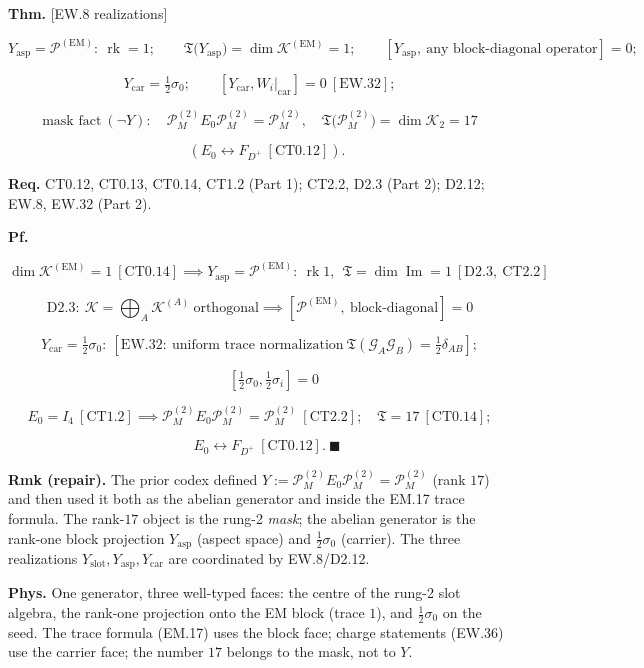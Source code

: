 \begin{theorem}\label{tag:EM-2}
\textbf{Thm.} [EW.8 realizations]

\[
Y_{\mathrm{asp}}=\mathcal P^{(\mathrm{EM})}:\ \operatorname{rk}=1;\qquad
\mathfrak T\bigl(Y_{\mathrm{asp}}\bigr)=\dim\mathcal K^{(\mathrm{EM})}=1;\qquad
[Y_{\mathrm{asp}},\ \text{any block-diagonal operator}]=0;
\]

\[
Y_{\mathrm{car}}=\tfrac12\sigma_0;\qquad[Y_{\mathrm{car}},W_i|_{\mathrm{car}}]=0\ [\mathrm{EW.32}];
\]

\[
\text{mask fact}\ (\neg Y):\quad\mathcal P_M^{(2)}E_0\mathcal P_M^{(2)}=\mathcal P_M^{(2)},\quad\mathfrak T\bigl(\mathcal P_M^{(2)}\bigr)=\dim\mathcal K_2=17
\]

\[
\quad (E_0\leftrightarrow F_{D^+}\ [\mathrm{CT0.12}]).
\]

\textbf{Req.} CT0.12, CT0.13, CT0.14, CT1.2 (Part 1); CT2.2, D2.3 (Part 2); D2.12; EW.8, EW.32 (Part 2).

\textbf{Pf.}

\[
\dim\mathcal K^{(\mathrm{EM})}=1\ [\mathrm{CT0.14}]\implies Y_{\mathrm{asp}}=\mathcal P^{(\mathrm{EM})}:\ \operatorname{rk}1,\ \ \mathfrak T=\dim\operatorname{Im}=1\ [\mathrm{D2.3},\ \mathrm{CT2.2}]
\]

\[
\mathrm{D2.3}:\ \mathcal K=\bigoplus_A\mathcal K^{(A)}\ \text{orthogonal}\implies[\mathcal P^{(\mathrm{EM})},\ \text{block-diagonal}]=0
\]

\[
Y_{\mathrm{car}}=\tfrac12\sigma_0:\ [\mathrm{EW.32}:\ \text{uniform trace normalization}\ \mathfrak T(\mathcal G_A\mathcal G_B)=\tfrac12\delta_{AB}];
\]

\[
\qquad [\tfrac12\sigma_0,\tfrac12\sigma_i]=0
\]

\[
E_0=I_4\ [\mathrm{CT1.2}]\implies\mathcal P_M^{(2)}E_0\mathcal P_M^{(2)}=\mathcal P_M^{(2)}\ [\mathrm{CT2.2}];\quad\mathfrak T=17\ [\mathrm{CT0.14}];
\]

\[
\quad E_0\leftrightarrow F_{D^+}\ [\mathrm{CT0.12}].\ \blacksquare
\]

\textbf{Rmk (repair).} The prior codex defined $Y:=\mathcal P_M^{(2)}E_0\mathcal P_M^{(2)}=\mathcal P_M^{(2)}$ (rank $17$) and then used it both as the abelian generator and inside the EM.17 trace formula. The rank-$17$ object is the rung-2 \textit{mask}; the abelian generator is the rank-one block projection $Y_{\mathrm{asp}}$ (aspect space) and $\tfrac12\sigma_0$ (carrier). The three realizations $Y_{\mathrm{slot}},Y_{\mathrm{asp}},Y_{\mathrm{car}}$ are coordinated by EW.8/D2.12.

\textbf{Phys.} One generator, three well-typed faces: the centre of the rung-2 slot algebra, the rank-one projection onto the EM block (trace $1$), and $\tfrac12\sigma_0$ on the seed. The trace formula (EM.17) uses the block face; charge statements (EW.36) use the carrier face; the number $17$ belongs to the mask, not to $Y$.

\end{theorem}

